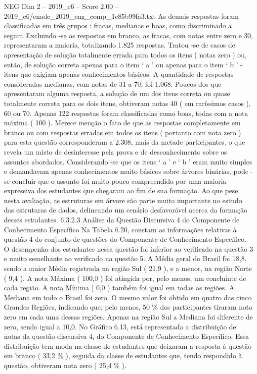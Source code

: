 \begin{textsample}{NEG Dim 2 – 2019\_c6 – Score 2.00 – 2019\_c6/enade\_2019\_eng\_comp\_1c85b99fa3.txt}
As demais respostas foram classificadas em três grupos : fracas, medianas e boas, como discriminado a seguir.
Excluindo -se as respostas em branco, as fracas, com notas entre zero e 30, representaram a maioria, totalizando 1.825 respostas.
Tratou -se de casos de apresentação de solução totalmente errada para todos os itens ( notas zero ) ou, então, de solução correta apenas para o item ‘ a ’ ou apenas para o item ‘ b ’ - itens que exigiam apenas conhecimentos básicos.
A quantidade de respostas consideradas medianas, com notas de 31 a 70, foi 1.068.
Poucos dos que apresentaram alguma resposta, a solução de um dos itens correta ou quase totalmente correta para os dois itens, obtiveram notas 40 ( em raríssimos casos ), 60 ou 70.
Apenas 122 respostas foram classificadas como boas, todas com a nota máxima ( 100 ).
Merece menção o fato de que as respostas completamente em branco ou com respostas erradas em todos os itens ( portanto com nota zero ) para esta questão corresponderam a 2.308, mais da metade participantes, o que revela um misto de desinteresse pela prova e de desconhecimento sobre os assuntos abordados.
Considerando -se que os itens ‘ a ’ e ‘ b ’ eram muito simples e demandavam apenas conhecimentos muito básicos sobre árvores binárias, pode -se concluir que o assunto foi muito pouco compreendido por uma maioria expressiva dos estudantes que chegaram ao fim de sua formação.
Ao que pese nesta avaliação, as estruturas em árvore são parte muito importante no estudo das estruturas de dados, delineando um cenário desfavorável acerca da formação desses estudantes. 6.3.2.3 Análise da Questão Discursiva 4 do Componente de Conhecimento Específico Na Tabela 6.20, constam as informações relativas à questão 4 do conjunto de questões do Componente de Conhecimento Específico.
O desempenho dos estudantes nessa questão foi inferior ao verificado na questão 3 e muito semelhante ao verificado na questão 5.
A Média geral do Brasil foi 18,8, sendo a maior Média registrada na região Sul ( 21,9 ), e a menor, na região Norte ( 9,4 ).
A nota Máxima ( 100,0 ) foi atingida por, pelo menos, um concluinte de cada região.
A nota Mínima ( 0,0 ) também foi igual em todas as regiões.
A Mediana em todo o Brasil foi zero.
O mesmo valor foi obtido em quatro das cinco Grandes Regiões, indicando que, pelo menos, 50 \% dos participantes tiraram nota zero em cada uma dessas regiões.
Apenas na região Sul a Mediana foi diferente de zero, sendo igual a 10,0.
No Gráfico 6.13, está representada a distribuição de notas da questão discursiva 4, do Componente de Conhecimento Específico.
Essa distribuição tem moda na classe de estudantes que deixaram a resposta à questão em branco ( 33,2 \% ), seguida da classe de estudantes que, tendo respondido à questão, obtiveram nota zero ( 25,4 \% ).

\end{textsample}
